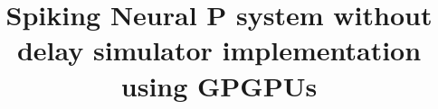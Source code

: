 \documentclass{acm_proc_article-sp}
\begin{document}
\title{ Spiking Neural P system without delay simulator implementation using GPGPUs }
%
%
%
%
%
\end{document}
